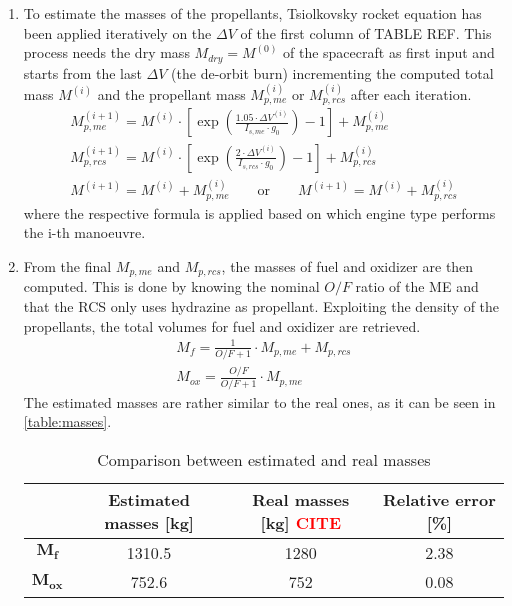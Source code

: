 \begin{enumerate}[itemsep=5mm]
    \item
    To estimate the masses of the propellants, Tsiolkovsky rocket equation has been applied iteratively on the $\Delta V$ of the first column of TABLE REF. This process needs the dry mass $M_{dry} = M^{(0)}$ of the spacecraft as first input and starts from the last $\Delta V$ (the de-orbit burn) incrementing the computed total mass $M^{(i)}$ and the propellant mass $M_{p,me}^{(i)}$ or $M_{p,rcs}^{(i)}$ after each iteration.
    \begin{gather}
        M_{p,me}^{(i+1)} = M^{(i)} \cdot \left[ \exp \left( \frac{1.05 \cdot \Delta V^{(i)}} {I_{s,me} \cdot g_0} \right) - 1 \right] + M_{p,me}^{(i)} 
        \label{eq:me_iteration} \\
        M_{p,rcs}^{(i+1)} = M^{(i)} \cdot \left[ \exp \left( \frac{2 \cdot \Delta V^{(i)}} {I_{s,rcs} \cdot g_0} \right) - 1 \right] + M_{p,rcs}^{(i)}
        \label{eq:rcs_iteration} \\
        M^{(i+1)} = M^{(i)} + M_{p,me}^{(i)}
        \qquad \textrm{or} \qquad
        M^{(i+1)} = M^{(i)} + M_{p,rcs}^{(i)}
    \end{gather} 
    where the respective formula is applied based on which engine type performs the i-th manoeuvre.
    
    \item
    From the final $M_{p,me}$ and $M_{p,rcs}$, the masses of fuel and oxidizer are then computed. This is done by knowing the nominal $O/F$ ratio of the ME \cite{Leros} and that the RCS only uses hydrazine as propellant.
    Exploiting the density of the propellants, the total volumes for fuel and oxidizer are retrieved.
    \begin{gather}
        M_{f} = \frac{1}{O/F + 1} \cdot M_{p,me} + M_{p,rcs} 
        \\
        M_{ox} = \frac{O/F}{O/F + 1} \cdot M_{p,me}
    \end{gather}
    The estimated masses are rather similar to the real ones, as it can be seen in \autoref{table:masses}.

    \begin{table}[H]
        \renewcommand{\arraystretch}{1.3}
        \centering
        \begin{tabular}{|c|c|c|c|}
            \hline
            & \textbf{Estimated masses [kg]} & \textbf{Real masses [kg]} \textcolor{red}{CITE} & \textbf{Relative error [\%]} \\
            \hline
            $\boldsymbol{M_{f}}$ & 1310.5 & 1280 & 2.38 \\
            \hline
            $\boldsymbol{M_{ox}}$ & 752.6 & 752 & 0.08 \\
            \hline
        \end{tabular}
        \caption{Comparison between estimated and real masses}
        \label{table:masses}
    \end{table}


\end{enumerate}
